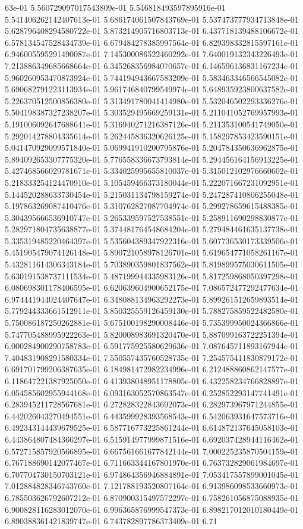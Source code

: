 63e-01	5.560729097017543809e-01	5.546818493597895916e-01	5.541406262142407613e-01	5.686174061507843769e-01	5.537473777934713848e-01	5.628796408294580722e-01	5.873214905716803713e-01	6.437718139488106672e-01	6.578134547528434739e-01	6.679484278385997564e-01	6.829398332815597161e-01	6.946005595291490087e-01	7.145300086522460292e-01	7.640019132343226493e-01	7.213886349685668664e-01	6.345268356984070657e-01	6.146596136831167234e-01	5.960260953470873924e-01	5.744194943667583209e-01	5.583463346566545082e-01	5.690682791223113934e-01	5.961746840799549974e-01	5.648935923800637582e-01	5.226370512500856380e-01	5.313491780041414980e-01	5.532046502293336276e-01	5.504198387327238207e-01	5.303529495669259131e-01	5.211041052769957993e-01	5.191006092647688641e-01	5.316940271216387126e-01	5.211353100541749050e-01	5.292014278804335614e-01	5.262445836320626125e-01	5.158297853423590151e-01	5.041470929099571840e-01	5.069941910200795876e-01	5.204784350636962875e-01	5.894092653307775320e-01	5.776558336673793814e-01	5.294456164156913225e-01	5.427468566029781671e-01	5.334025995655810037e-01	5.315012102976660602e-01	5.218333254124470910e-01	5.105459466373180044e-01	5.222071667231092951e-01	5.144520288633730454e-01	5.215031134798159274e-01	5.247287410806255048e-01	5.197863269087410476e-01	5.310762827087704974e-01	5.299278659615488385e-01	5.304395666536910747e-01	5.265339597527538551e-01	5.258911690298830877e-01	5.282971804735638877e-01	5.374481764548684204e-01	5.279484461635137738e-01	5.335319485220464397e-01	5.535604389347922316e-01	5.607736530173339506e-01	5.451905479074126148e-01	5.890721058978126701e-01	5.619654771058261167e-01	5.432811614306343184e-01	5.703890359801837562e-01	5.819899575030611505e-01	5.630191538737111534e-01	5.487199944335983126e-01	5.817259868050397298e-01	6.080698301178406595e-01	6.620639604900652175e-01	7.086572477292477634e-01	6.974441944024407647e-01	6.348088134963292273e-01	5.899261512659893514e-01	5.779244333661512911e-01	5.850325559126459130e-01	5.788275859522482580e-01	5.750086187250262881e-01	5.675100198290008446e-01	5.735399950024366866e-01	5.747705488995922263e-01	5.820008983691320470e-01	5.887099163722251394e-01	6.000284900290758783e-01	6.591775925580629636e-01	7.087645711893167944e-01	7.404831908291580334e-01	7.550557435760528735e-01	7.254575411830879172e-01	6.691701799206387635e-01	6.184981472982234996e-01	6.212488860862147577e-01	6.118647221387925050e-01	6.413938048951178805e-01	6.432258234766828897e-01	6.054585602955944168e-01	6.093163052570863547e-01	6.252852293147741491e-01	6.283945211728567681e-01	6.272828322843692073e-01	6.282973967971244855e-01	6.442026043270494551e-01	6.443599928393568543e-01	6.542063931647573716e-01	6.492343144439679525e-01	6.587716773225861244e-01	6.614872137645058103e-01	6.443864807484366297e-01	6.515914977999871516e-01	6.692037428944116462e-01	6.572715857920566895e-01	6.667561661677842144e-01	7.000225235870504159e-01	6.767188690142077467e-01	6.711663344167801970e-01	6.763732829061984697e-01	6.707704730150703121e-01	6.974864356946884891e-01	7.053417557899001045e-01	7.012884828346743760e-01	7.121788193520807164e-01	6.913986098533660973e-01	6.785503626792607212e-01	6.870900315497572297e-01	6.758261056875088935e-01	6.900828116283012070e-01	6.996365876999547373e-01	6.898217012010180449e-01	6.890388361421839747e-01	6.743782897786373409e-01	6.71